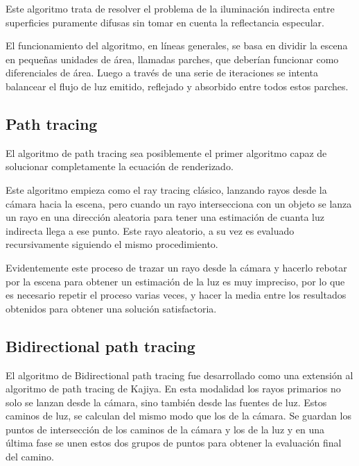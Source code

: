 \medskip

Este algoritmo trata de resolver el problema de la iluminación indirecta entre superficies puramente difusas sin tomar en cuenta la reflectancia especular.

\medskip

El funcionamiento del algoritmo, en líneas generales, se basa en dividir la escena en pequeñas unidades de área, llamadas parches, que deberían funcionar como diferenciales de área. Luego a través de una serie de iteraciones se intenta balancear el flujo de luz emitido, reflejado y absorbido entre todos estos parches.

\clearpage

\subsection{Path tracing}

El algoritmo de path tracing \cite{Kajiya1986} sea posiblemente el primer algoritmo capaz de solucionar completamente la ecuación de renderizado.

\medskip

Este algoritmo empieza como el ray tracing clásico, lanzando rayos desde la cámara hacia la escena, pero cuando un rayo intersecciona con un objeto se lanza un rayo en una dirección aleatoria para tener una estimación de cuanta luz indirecta llega a ese punto. Este rayo aleatorio, a su vez es evaluado recursivamente siguiendo el mismo procedimiento. 

\medskip 

Evidentemente este proceso de trazar un rayo desde la cámara y hacerlo rebotar por la escena para obtener un estimación de la luz es muy impreciso, por lo que es necesario repetir el proceso varias veces, y hacer la media entre los resultados obtenidos para obtener una solución satisfactoria. 

\subsection{Bidirectional path tracing}

El algoritmo de Bidirectional path tracing \cite{Lafortune1993} fue desarrollado como una extensión al algoritmo de path tracing de Kajiya. En esta modalidad los rayos primarios no solo se lanzan desde la cámara, sino también desde las fuentes de luz. Estos caminos de luz, se calculan del mismo modo que los de la cámara. Se guardan los puntos de intersección de los caminos de la cámara y los de la luz y en una última fase se unen estos dos grupos de puntos para obtener la evaluación final del camino.

